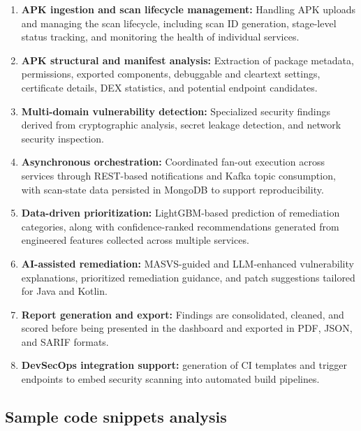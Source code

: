 \documentclass[preprint,12pt, a4paper]{elsarticle}
\begin{document}
\begin{enumerate}
    \item \textbf{APK ingestion and scan lifecycle management:} Handling APK uploads and managing the scan lifecycle, including scan ID generation, stage-level status tracking, and monitoring the health of individual services.

    \item \textbf{APK structural and manifest analysis:} Extraction of package metadata, permissions, exported components, debuggable and cleartext settings, certificate details, DEX statistics, and potential endpoint candidates.

    \item \textbf{Multi-domain vulnerability detection:} Specialized security findings derived from cryptographic analysis, secret leakage detection, and network security inspection.

    \item \textbf{Asynchronous orchestration:} Coordinated fan-out execution across services through REST-based notifications and Kafka topic consumption, with scan-state data persisted in MongoDB to support reproducibility.

    \item \textbf{Data-driven prioritization:} LightGBM-based prediction of remediation categories, along with confidence-ranked recommendations generated from engineered features collected across multiple services.
    
    \item \textbf{AI-assisted remediation:} MASVS-guided and LLM-enhanced vulnerability explanations, prioritized remediation guidance, and patch suggestions tailored for Java and Kotlin.
    
    \item \textbf{Report generation and export:} Findings are consolidated, cleaned, and scored before being presented in the dashboard and exported in PDF, JSON, and SARIF formats.
    
    \item \textbf{DevSecOps integration support:} generation of CI templates and trigger endpoints to embed security scanning into automated build pipelines.
\end{enumerate}

\subsection{Sample code snippets analysis}
\end{document}
